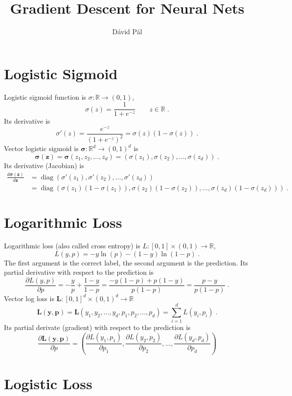 \documentclass[12pt]{article}
\title{Gradient Descent for Neural Nets}
\author{D\'avid P\'al}
\DeclareMathOperator{\diag}{diag}
\newcommand{\R}{\mathbb{R}}
\newcommand{\bsigma}{\pmb{\sigma}}
\newcommand{\y}{\mathbf{y}}
\newcommand{\p}{\mathbf{p}}
\newcommand{\z}{\mathbf{z}}
\renewcommand{\L}{\mathbf{L}}
\begin{document}
\maketitle

\section{Logistic Sigmoid}

Logistic sigmoid function is $\sigma:\R \to (0,1)$,
$$
\sigma(z) = \frac{1}{1 + e^{-z}} \qquad z \in \R \; .
$$
Its derivative is
$$
\sigma'(z) = \frac{e^{-z}}{(1 + e^{-z})^2} = \sigma(z) (1 - \sigma(z)) \; .
$$
Vector logistic sigmoid is $\bsigma:\R^d \to (0,1)^d$ is
$$
\bsigma(\z) = \bsigma(z_1, z_2, \dots, z_d) = (\sigma(z_1), \sigma(z_2), \dots, \sigma(z_d)) \; .
$$
Its derivative (Jacobian) is
\begin{align*}
\frac{d \bsigma(\z)}{d\z}
& = \diag(\sigma'(z_1), \sigma'(z_2), \dots, \sigma'(z_d)) \\
& = \diag(\sigma(z_1) (1 - \sigma(z_1)), \sigma(z_2) (1 - \sigma(z_2)), \dots, \sigma(z_d) (1 - \sigma(z_d))) \; .
\end{align*}

\section{Logarithmic Loss}

Logarithmic loss (also called cross entropy) is $L:[0,1] \times (0,1) \to \R$,
$$
L(y,p) = - y \ln(p) - (1-y) \ln(1-p) \; .
$$
The first argument is the correct label, the second argument
is the prediction. Its partial derivative with respect to the prediction is
$$
\frac{\partial L(y,p)}{\partial p} = - \frac{y}{p} + \frac{1-y}{1-p} = \frac{-y(1-p) + p(1-y)}{p(1-p)} = \frac{p-y}{p(1-p)} \; .
$$
Vector log loss is $\L:[0,1]^d \times (0,1)^d \to \R$
$$
\L(\y,\p) = \L(y_1, y_2, \dots, y_d, p_1, p_2, \dots, p_d) = \sum_{i=1}^d L(y_i, p_i) \; .
$$
Its partial derivate (gradient) with respect to the prediction is
$$
\frac{\partial \L(\y, \p)}{\partial p}
= \left(\frac{\partial L(y_1,p_1)}{\partial p_1}, \frac{\partial L(y_2,p_2)}{\partial p_2}, \dots, \frac{\partial L(y_d,p_d)}{\partial p_d} \right)
$$

\section{Logistic Loss}
\end{document}
